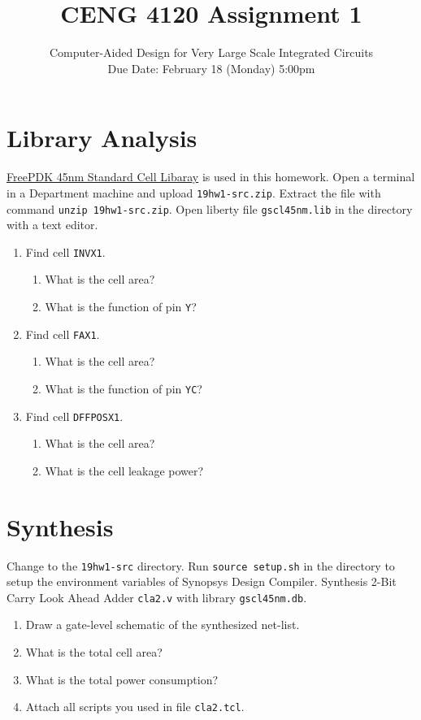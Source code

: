 \documentclass[acmlarge,screen=true,anonymous=false,11pt]{acmart}
\begin{document}
\title{CENG 4120 Assignment 1}
\subtitle{Computer-Aided Design for Very Large Scale Integrated Circuits \\ Due Date: February 18 (Monday) 5:00pm}

\maketitle

\section{Library Analysis}
\href{https://www.eda.ncsu.edu/wiki/FreePDK45:Contents}{FreePDK 45nm Standard Cell Libaray} is used in this homework.
Open a terminal in a Department machine and upload \texttt{19hw1-src.zip}.
Extract the file with command \texttt{unzip 19hw1-src.zip}.
Open liberty file \texttt{gscl45nm.lib} in the directory with a text editor.
\begin{enumerate}
    \item Find cell \texttt{INVX1}. \begin{enumerate}
        \item What is the cell area?
        \item What is the function of pin \texttt{Y}?
    \end{enumerate}
    \item Find cell \texttt{FAX1}. \begin{enumerate}
        \item What is the cell area?
        \item What is the function of pin \texttt{YC}?
    \end{enumerate}
    \item Find cell \texttt{DFFPOSX1}. \begin{enumerate}
        \item What is the cell area?
        \item What is the cell leakage power?
    \end{enumerate}
\end{enumerate}

\section{Synthesis}
Change to the \texttt{19hw1-src} directory. Run \texttt{source setup.sh} in the directory to setup the environment variables of Synopsys Design Compiler. Synthesis 2-Bit Carry Look Ahead Adder \texttt{cla2.v} with library \texttt{gscl45nm.db}.
\begin{enumerate}
    \item Draw a gate-level schematic of the synthesized net-list.
    \item What is the total cell area?
    \item What is the total power consumption?
    \item Attach all scripts you used in file \texttt{cla2.tcl}.
\end{enumerate}
\end{document}
